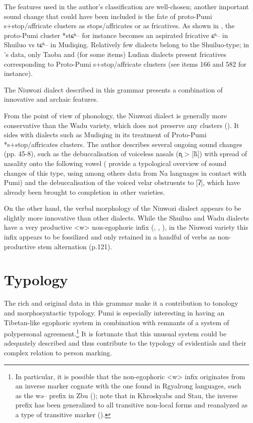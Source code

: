 \documentclass[oldfontcommands,oneside,a4paper,11pt]{article}
\newcommand{\ipa}[1]{{\phon #1}} %
\newcommand{\ipapl}[1]{{\phondroit #1}}
\begin{document}
The features used in the author's classification are well-chosen; another important sound change that could have been included is the fate of proto-Pumi s+stop/affricate clusters as stops/affricates or as fricatives. As shown in \citet{jacques11lingua}, the proto-Pumi cluster *\ipa{stɕʰ--} for instance becomes an aspirated fricative \ipa{ɕʰ--} in Shuiluo vs \ipa{tɕʰ--} in Mudiqing. Relatively few dialects belong to the Shuiluo-type; in \citet{lusz01pumi}'s data, only Taoba and (for some items) Ludian dialects present fricatives corresponding to Proto-Pumi s+stop/affricate clusters (see items 166 and 582 for instance).

The Niuwozi dialect described in this grammar presents a combination of innovative and archaic features. 
 
From the point of view of phonology, the Niuwozi dialect is generally more conservative than the Wadu variety, which does not preserve any clusters (\citealt[20-1]{daudey14grammar}). It sides with dialects such as Mudiqing in its treatment of Proto-Pumi *s+stop/affricates clusters. The author describes several ongoing sound changes (pp. 45-8), such as the debuccalisation of voiceless nasals (\ipapl{n̥} > [\ipapl{h̃}]) with spread of nasality onto the following vowel (\citealt{michaud-jacques12nasalite} provide a typological overview of sound changes of this type, using among others data from Na languages in contact with Pumi) and the debuccalisation of the voiced velar obstruents to [\ipapl{ʔ}], which have already been brought to completion in other varieties.
 
On the other hand, the verbal morphology of the Niuwozi dialect appears to be slightly more innovative than other dialects. While the Shuiluo and  Wadu dialects have a very productive <w> non-egophoric infix (\citealt{jacques11pumi.tone}, \citealt[338]{daudey14grammar}, \citealt[80]{daudey14volition}), in the Niuwozi variety this infix appears to be fossilized and only retained in a handful of verbs as non-productive stem alternation (p.121). 
 
 

\section{Typology}
The rich and original data in this grammar make it a contribution to tonology and  morphosyntactic typology. Pumi is especially interesting in having an Tibetan-like egophoric system in combination with remnants of a system of polypersonal agreement.\footnote{In particular, it is possible that the non-egophoric <w> infix originates from an inverse marker cognate with the one found in Rgyalrong languages, such as the \ipa{wə--} prefix in Zbu (\citealt{gongxun14agreement}); note that in Khroskyabs and Stau, the inverse prefix has been generalized to all transitive non-local forms and reanalyzed as a type of transitive marker (\citealt{lai14person, jacques14rtau}).} It is fortunate that this unusual system could be adequately described and thus contribute to the typology of evidentials and their complex relation to person marking.
\end{document}
